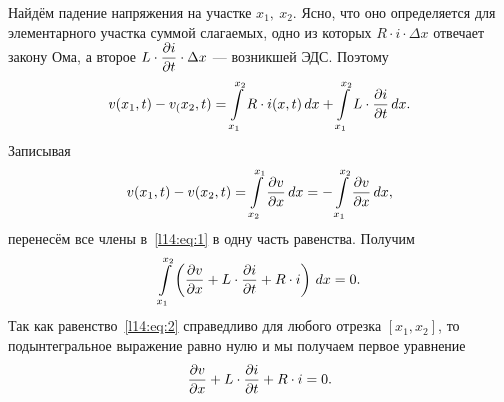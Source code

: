 Найдём падение напряжения на участке $x_1,\ x_2$. Ясно, что оно определяется для элементарного участка суммой слагаемых, одно из которых $R\cdot i\cdot\Delta x$ отвечает закону Ома, а второе $\displaystyle L\cdot\frac{\partial i}{\partial t}\cdot\Delta x$ --- возникшей ЭДС. Поэтому 
\begin{equation}\label{l14:eq:1}
	 v(x_1,t)-v_(x_2,t)=\int\limits_{x_1}^{x_2}R\cdot i(x,t)\,dx+\int\limits_{x_1}^{x_2}L\cdot\frac{\partial i}{\partial t}\,dx.
\end{equation}
Записывая
\begin{equation*}
	 v(x_1,t)-v(x_2,t)=\int\limits_{x_2}^{x_1}\frac{\partial v}{\partial x}\,dx=-\int\limits_{x_1}^{x_2}\frac{\partial v}{\partial x}\,dx,
\end{equation*}
перенесём все члены в~\eqref{l14:eq:1} в одну часть равенства. Получим 
\begin{equation}\label{l14:eq:2}
	 \int\limits_{x_1}^{x_2}\left(\frac{\partial v}{\partial x}+L\cdot\frac{\partial i}{\partial t}+R\cdot i\right)\,dx=0.
\end{equation}
Так как равенство~\eqref{l14:eq:2} справедливо для любого отрезка $[x_1,x_2]$, то подынтегральное выражение равно нулю и мы получаем первое уравнение
\begin{equation}\label{l14:eq:3}
	 \frac{\partial v}{\partial x}+L\cdot\frac{\partial i}{\partial t}+R\cdot i=0.
\end{equation}

